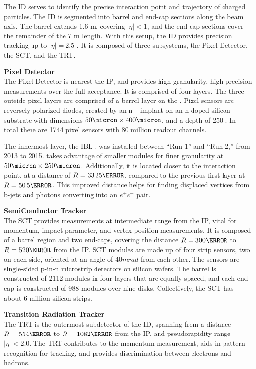 The \gls{ID} serves to identify the precise interaction point and trajectory of charged particles. The \gls{ID} is segmented into barrel and end-cap sections along the beam axis. The barrel extends 1.6 m, covering $|\eta| < 1$, and the end-cap sections cover the remainder of the 7 m length. With this setup, the \gls{ID} provides precision tracking up to $|\eta| = 2.5$ \cite{inner-detector-tdr}. It is composed of three subsystems, the Pixel Detector, the \gls{SCT}, and the \gls{TRT}.

\noindent\textbf{Pixel Detector}\\
\indent The Pixel Detector is nearest the \gls{IP}, and provides high-granularity, high-precision measurements over the full acceptance. It is comprised of four layers. The three outside pixel layers are comprised of a barrel-layer on the . Pixel sensors are reversely polarized diodes, created by an n+ implant on an n-doped silicon substrate with dimensions $50 \micron \times 400 \micron$, and a depth of 250 \micron. In total there are 1744 pixel sensors with 80 million readout channels.
    
The innermost layer, the \gls{IBL} \cite{ibl-tdr}, was installed between ``Run 1'' and ``Run 2,'' from 2013 to 2015. takes advantage of smaller modules for finer granularity at $\unit{50}{\micron} \times \unit{250}{\micron}$. Additionally, it is located closer to the interaction point, at a distance of $R=\unit{33.25}{\mm}$, compared to the previous first layer at $R=\unit{50.5}{\mm}$. This improved distance helps for finding displaced vertices from b-jets and photons converting into an $e^+e^-$ pair.

\noindent\textbf{SemiConductor Tracker}\\
\indent The \gls{SCT} provides measurements at intermediate range from the \gls{IP}, vital for momentum, impact parameter, and vertex position measurements. It is composed of a barrel region and two end-caps, covering the distance $R=\unit{300}{\mm}$ to $R= \unit{520}{\mm}$ from the \gls{IP}. \gls{SCT} modules are made up of four strip sensors, two on each side, oriented at an angle of $\unit{40}{mrad}$ from each other. The sensors are single-sided p-in-n microstrip detectors on silicon wafers. The barrel is constructed of 2112 modules in four layers that are equally spaced, and each end-cap is constructed of 988 modules over nine disks. Collectively, the \gls{SCT} has about 6 million silicon strips.

\noindent\textbf{Transition Radiation Tracker}\\
\indent The \gls{TRT} is the outermost subdetector of the \gls{ID}, spanning from a distance $R=\unit{554}{\mm}$ to $R= \unit{1082}{\mm}$ from the \gls{IP}, and pseudorapidity range $|\eta| < 2.0$. The \gls{TRT} contributes to the momentum measurement, aids in pattern recognition for tracking, and provides discrimination between electrons and hadrons. 

